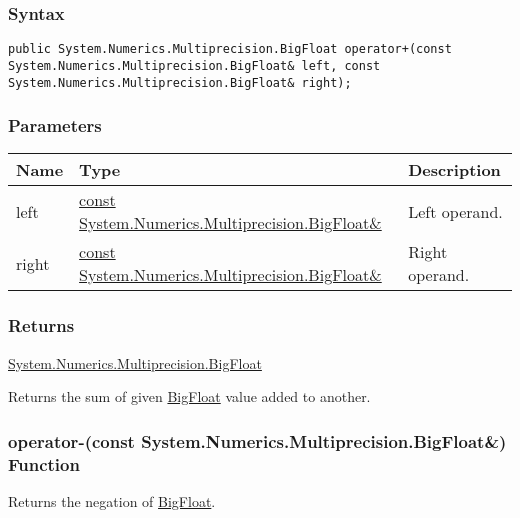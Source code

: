 \documentclass[a4paper,oneside,11.000000pt]{book}
\begin{document}
\subsubsection*{Syntax}
\texttt{public System.Numerics.Multiprecision.BigFloat operator+(const System.Numerics.Multiprecision.BigFloat\& left, const System.Numerics.Multiprecision.BigFloat\& right);}
\subsubsection*{Parameters}
\begin{flushleft}
\begin{supertabular}[l]{!{\raggedright}p{1.30721cm}!{\raggedright}p{8.55945cm}!{\raggedright}p{3.66839cm}}
\textbf{Name}
& \textbf{Type}
& \textbf{Description}
\\
\hline
left
& \hyperlink{System.Numerics.Multiprecision.BigFloat}{const System.\-Numerics.\-Multiprecision.\-BigFloat\&\-}
& Left operand.

\\
right
& \hyperlink{System.Numerics.Multiprecision.BigFloat}{const System.\-Numerics.\-Multiprecision.\-BigFloat\&\-}
& Right operand.

\\
\end{supertabular}

\end{flushleft}
\subsubsection*{Returns}
\hyperlink{System.Numerics.Multiprecision.BigFloat}{System.\-Numerics.\-Multiprecision.\-BigFloat}
\begin{flushleft}
Returns the sum of given \hyperlink{System.Numerics.Multiprecision.BigFloat}{BigFloat} value added to another.

\end{flushleft}
\clearpage

\hypertarget{System.Numerics.Multiprecision.operator.minus.C.R.System.Numerics.Multiprecision.BigFloat}{\subsubsection*{operator-(const System.Numerics.Multiprecision.BigFloat\&) Function}}
\begin{flushleft}
Returns the negation of \hyperlink{System.Numerics.Multiprecision.BigFloat}{BigFloat}.

\end{flushleft}
\end{document}
